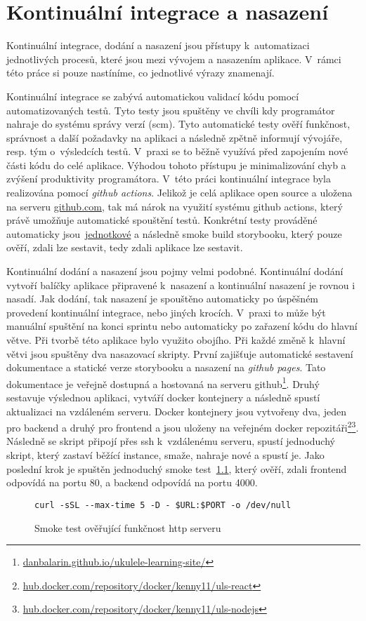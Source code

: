 \chapter{Kontinuální integrace a nasazení}
\label{ch:ci_cd}
Kontinuální integrace, dodání a nasazení jsou přístupy k~automatizaci jednotlivých procesů, které jsou mezi vývojem a nasazením aplikace. V~rámci této práce si pouze nastíníme, co jednotlivé výrazy znamenají.

Kontinuální integrace se zabývá automatickou validací kódu pomocí automatizovaných testů. Tyto testy jsou spuštěny ve chvíli kdy programátor nahraje do systému správy verzí (\acrshort{scm}). Tyto automatické testy ověří funkčnost, správnost a další požadavky na aplikaci a následně zpětně informují vývojáře, resp. tým o~výsledcích testů. V~praxi se to běžně využívá před zapojením nové části kódu do celé aplikace. Výhodou tohoto přístupu je minimalizování chyb a zvýšení produktivity programátora. V~této práci kontinuální integrace byla realizována pomocí \emph{github actions}. Jelikož je celá aplikace open source a uložena na serveru \href{www.github.com}{github.com}, tak má nárok na využití systému github actions, který právě umožňuje automatické spouštění testů. Konkrétní testy prováděné automaticky jsou~\hyperref[sc:unit_tests]{jednotkové} a následně smoke build storybooku, který pouze ověří, zdali lze sestavit, tedy zdali aplikace lze sestavit. \cite[s.~7]{rossel_2017_continuous}

Kontinuální dodání a nasazení jsou pojmy velmi podobné. Kontinuální dodání vytvoří balíčky aplikace připravené k~nasazení a kontinuální nasazení je rovnou i nasadí. Jak dodání, tak nasazení je spouštěno automaticky po úspěšném provedení kontinuální integrace, nebo jiných krocích. V~praxi to může být manuální spuštění na konci sprintu nebo automaticky po zařazení kódu do hlavní větve. \cite[s.~18]{rossel_2017_continuous} Při tvorbě této aplikace bylo využito obojího. Při každé změně k~hlavní větvi jsou spuštěny dva nasazovací skripty. První zajišťuje automatické sestavení dokumentace a statické verze storybooku a nasazení na \emph{github pages}. Tato dokumentace je veřejně dostupná a hostovaná na serveru github\footnote{\href{https://danbalarin.github.io/ukulele-learning-site/}{danbalarin.github.io/ukulele-learning-site/}}. Druhý sestavuje výslednou aplikaci, vytváří docker kontejnery a následně spustí aktualizaci na vzdáleném serveru. Docker kontejnery jsou vytvořeny dva, jeden pro backend a druhý pro frontend a jsou uloženy na veřejném docker repozitáři\footnote{\href{https://hub.docker.com/repository/docker/kenny11/uls-react}{hub.docker.com/repository/docker/kenny11/uls-react}}\footnote{\href{https://hub.docker.com/repository/docker/kenny11/uls-nodejs}{hub.docker.com/repository/docker/kenny11/uls-nodejs}}. Následně se skript připojí přes ssh k~vzdálenému serveru, spustí jednoduchý skript, který zastaví běžící instance, smaže, nahraje nové a spustí je. Jako poslední krok je spuštěn jednoduchý smoke test~\ref{code:smoke}, který ověří, zdali frontend odpovídá na portu 80, a backend odpovídá na portu 4000.

\begin{figure}[h!]
    \centering
    \begin{verbatim}
curl -sSL --max-time 5 -D - $URL:$PORT -o /dev/null
    \end{verbatim}
    \caption{Smoke test ověřující funkčnost http serveru}
    \label{code:smoke}
\end{figure}
